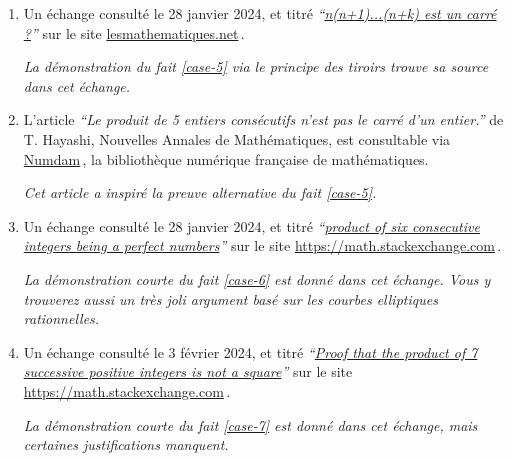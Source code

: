 

\begin{enumerate}
	\item Un échange consulté le 28 janvier 2024, et titré 
	\emph{\enquote{\href{https://les-mathematiques.net/vanilla/discussion/comment/351293}{n(n+1)...(n+k) est un carré ?}}} 
	sur le site \url{lesmathematiques.net}\,.
	
	\smallskip
	\noindent
	\emph{La démonstration du fait \ref{case-5}  via le principe des tiroirs trouve sa source dans cet échange.}


	\item L'article \emph{\enquote{Le produit de 5 entiers consécutifs n'est pas le carré d'un entier.}} de T. Hayashi, Nouvelles Annales de Mathématiques, est consultable via \href{https://numdam.org}{Numdam}\,, la bibliothèque numérique française de mathématiques.
	
	\smallskip
	\noindent
	\emph{Cet article a inspiré la preuve alternative du fait \ref{case-5}.}




	\item Un échange consulté le 28 janvier 2024, et titré
	\emph{\enquote{\href{https://math.stackexchange.com/q/90894/52365}{product of six consecutive integers being a perfect numbers}}} 
	sur le site \url{https://math.stackexchange.com}\,.
	
	\smallskip
	\noindent
	\emph{La démonstration courte du fait \ref{case-6} est donné dans cet échange. Vous y trouverez aussi un très joli argument basé sur les courbes elliptiques rationnelles.}




	\item Un échange consulté le 3 février 2024, et titré
	\emph{\enquote{\href{https://math.stackexchange.com/q/2334887/52365}{Proof that the product of 7 successive positive integers is not a square}}} 
	sur le site \url{https://math.stackexchange.com}\,.
	
	\smallskip
	\noindent
	\emph{La démonstration courte du fait \ref{case-7} est donné dans cet échange, mais certaines justifications manquent.}
\end{enumerate}
